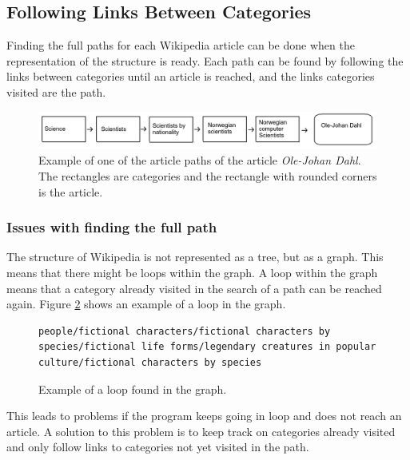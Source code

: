 \subsection{Following Links Between Categories}
Finding the full paths for each Wikipedia article can be done when the representation of the structure is ready. Each path can be found by following the links between categories until an article is reached, and the links categories visited are the path. 

\begin{figure}[h]
\centering
\includegraphics[width=\textwidth]{Chapters/Implementation/example_path}
\caption[Example of an article path]{Example of one of the article paths of the article \emph{Ole-Johan Dahl}. The rectangles are categories and the rectangle with rounded corners is the article. }
\label{fig:examplepath}
\end{figure}

\subsubsection{Issues with finding the full path}
The structure of Wikipedia is not represented as a tree, but as a graph. This means that there might be loops within the graph. A loop within the graph means that a category already visited in the search of a path can be reached again. Figure \ref{fig:exampleloop} shows an example of a loop in the graph. 

\begin{figure}[h]
\centering
\begin{lstlisting}
people/fictional characters/fictional characters by species/fictional life forms/legendary creatures in popular culture/fictional characters by species
\end{lstlisting}
\caption{Example of a loop found in the graph.}
\label{fig:exampleloop}
\end{figure}


This leads to problems if the program keeps going in loop and does not reach an article. A solution to this problem is to keep track on categories already visited and only follow links to categories not yet visited in the path. 

